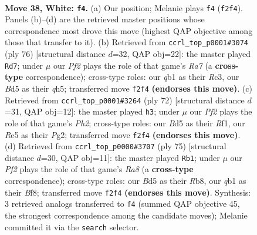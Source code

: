 \documentclass[11pt]{article}
\begin{document}
\clearpage

\begin{figure}[p]\centering
\begin{subfigure}{0.46\textwidth}\centering
\resizebox{\linewidth}{!}{%
\newchessgame
\chessboard[
  setfen={8/pp4kp/6p1/3BR3/6PP/b7/5PK1/1q6 w - - 1 38},
  showmover=false,
  pgfstyle=straightmove, color=movearrow, markmove={f2-f4}
]}
\caption{}
\end{subfigure}\hfill
\begin{subfigure}{0.46\textwidth}\centering
\resizebox{\linewidth}{!}{%
\newchessgame
\chessboard[
  setfen={8/R4ppk/1p1p3p/4p2q/4P3/2R2P2/5B2/6K1 w - - 2 39},
  showmover=false,
  pgfstyle=straightmove, color=movearrow, markmove={a7-d7}
]}
\caption{}
\end{subfigure}
\\[4pt]
\begin{subfigure}{0.46\textwidth}\centering
\resizebox{\linewidth}{!}{%
\newchessgame
\chessboard[
  setfen={2R5/5pkp/4p3/5p2/8/4P3/q5PP/5RK1 w - - 2 37},
  showmover=false,
  pgfstyle=straightmove, color=movearrow, markmove={h2-h3}
]}
\caption{}
\end{subfigure}\hfill
\begin{subfigure}{0.46\textwidth}\centering
\resizebox{\linewidth}{!}{%
\newchessgame
\chessboard[
  setfen={1r3bk1/1P3p2/2Q1P1pp/8/5P2/7P/6PK/r7 b - - 1 38},
  showmover=false,
  pgfstyle=straightmove, color=movearrow, markmove={a1-b1}
]}
\caption{}
\end{subfigure}
\caption{\textbf{Move 38, White: \texttt{f4}.} (a) Our position; Melanie plays \texttt{f4} (\texttt{f2f4}). Panels (b)--(d) are the retrieved master positions whose correspondence most drove this move (highest QAP objective among those that transfer to it). (b) Retrieved from \texttt{ccrl\_top\_p0001\#3074} (ply 76) [structural distance $d$=32, QAP obj=22]: the master played \texttt{Rd7}; under $\mu$ our \emph{Pf2} plays the role of that game's \emph{Ra7} (a \textbf{cross-type} correspondence); cross-type roles: our \emph{q}b1 as their \emph{R}c3, our \emph{B}d5 as their \emph{q}h5; transferred move \texttt{f2f4} \textbf{(endorses this move)}. (c) Retrieved from \texttt{ccrl\_top\_p0001\#3264} (ply 72) [structural distance $d$=31, QAP obj=12]: the master played \texttt{h3}; under $\mu$ our \emph{Pf2} plays the role of that game's \emph{Ph2}; cross-type roles: our \emph{B}d5 as their \emph{R}f1, our \emph{R}e5 as their \emph{P}g2; transferred move \texttt{f2f4} \textbf{(endorses this move)}. (d) Retrieved from \texttt{ccrl\_top\_p0000\#3707} (ply 75) [structural distance $d$=30, QAP obj=11]: the master played \texttt{Rb1}; under $\mu$ our \emph{Pf2} plays the role of that game's \emph{Ra8} (a \textbf{cross-type} correspondence); cross-type roles: our \emph{B}d5 as their \emph{R}b8, our \emph{q}b1 as their \emph{B}f8; transferred move \texttt{f2f4} \textbf{(endorses this move)}. Synthesis: 3 retrieved analogs transferred to \texttt{f4} (summed QAP objective 45, the strongest correspondence among the candidate moves); Melanie committed it via the \texttt{search} selector.}
\label{fig:thought-m74}
\end{figure}
\end{document}
